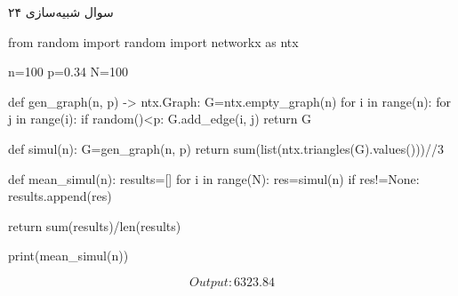 سوال شبیه‌سازی ۲۴

\begin{latin}
\begin{python}
from random import random
import networkx as ntx

n=100
p=0.34
N=100

def gen_graph(n, p) -> ntx.Graph:
	G=ntx.empty_graph(n)
	for i in range(n):
		for j in range(i):
			if random()<p:
				G.add_edge(i, j)
	return G

def simul(n):
	G=gen_graph(n, p)
	return sum(list(ntx.triangles(G).values()))//3

def mean_simul(n):
	results=[]
	for i in range(N):
		res=simul(n)
		if res!=None:
			results.append(res)
	
	return sum(results)/len(results)


print(mean_simul(n))
\end{python}
\end{latin}

$$Output: 6323.84$$